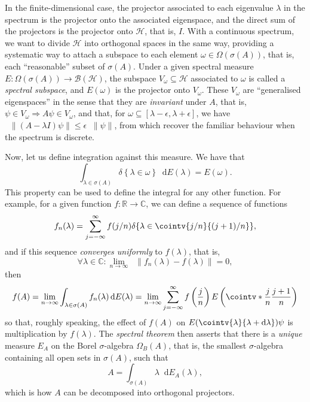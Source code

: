 \documentclass[10pt, a4paper]{article}
\numberwithin{equation}{section} %
\theoremstyle{definition}
\theoremstyle{plain}
\newcommand{\norm}[1]{\mathop{}\left\lVert#1\right\rVert}
\newcommand{\dif}{\mathop{}\!\mathrm{d}} %
\newcommand{\?}{\mathrel{?}} %
\newcommand{\R}{\mathbb{R}} %
\newcommand{\C}{\mathbb{C}} %
\newcommand{\indic}[1]{\delta{\left\{#1\right\}}} %
\newcommand{\Hs}{\mathcal{H}} %
\begin{document}
\begin{appendices}
                    In the finite-dimensional case, the projector associated to each eigenvalue \(\lambda\) in the spectrum is the projector onto the associated eigenspace, and the direct sum of the projectors is the projector onto \(\Hs\), that is, \(I\). With a continuous spectrum, we want to divide \(\Hs\) into orthogonal spaces in the same way, providing a systematic way to attach a subspace to each element \(\omega \in \Omega(\sigma(A))\), that is, each ``reasonable'' subset of \(\sigma(A)\). Under a given spectral measure \(E : \Omega(\sigma(A)) \to \mathcal{B}(\Hs)\), the subspace \(V_{\omega} \subseteq \Hs\) associated to \(\omega\) is called a \emph{spectral subspace}, and \(E(\omega)\) is the projector onto \(V_{\omega}\). These \(V_{\omega}\) are ``generalised eigenspaces'' in the sense that they are \emph{invariant} under \(A\), that is, \(\psi \in V_{\omega} \Rightarrow A\psi \in V_{\omega}\), and that, for \(\omega \subseteq [\lambda - \epsilon, \lambda + \epsilon]\), we have \(\norm{(A - \lambda I)\psi} \leq \epsilon\norm{\psi}\), from which recover the familiar behaviour when the spectrum is discrete.

                    Now, let us define integration against this measure. We have that
                    \[ \int_{\lambda \in \sigma(A)} \indic{\lambda \in \omega} \dif{E(\lambda)} = E(\omega). \]
                    This property can be used to define the integral for any other function. For example, for a given function \(f : \R \to \C\), we can define a sequence of functions
                    \[ f_n(\lambda) = \sum_{j = -\infty}^{\infty} f(j/n) \indic{\lambda \in \cointv{j/n}{(j+1)/n}}, \]
                    and if this sequence \emph{converges uniformly} to \(f(\lambda)\), that is,
                    \[ \forall \lambda \in \C : \lim_{n \to \infty} \norm{f_n(\lambda) - f(\lambda)} = 0, \]
                    then
                    \[ f(A) = \lim_{n\to\infty} \int_{\lambda \in \sigma(A)} f_n(\lambda) \dif{E(\lambda)} = \lim_{n\to\infty} \sum_{j = -\infty}^{\infty} f\left(\frac{j}{n}\right) E\left(\cointv*{\frac{j}{n}}{\frac{j+1}{n}}\right) \]
                    so that, roughly speaking, the effect of \(f(A)\) on \(E(\cointv{\lambda}{\lambda+\dif{\lambda}})\psi\) is multiplication by \(f(\lambda)\). The \emph{spectral theorem} then asserts that there is a \emph{unique} measure \(E_A\) on the Borel \(\sigma\)-algebra \(\Omega_B(A)\), that is, the smallest \(\sigma\)-algebra containing all open sets in \(\sigma(A)\), such that
                    \[ A = \int_{\sigma(A)} \lambda \dif{E_A(\lambda)}, \]
                    which is how \(A\) can be decomposed into orthogonal projectors.


\end{appendices}
\end{document}
